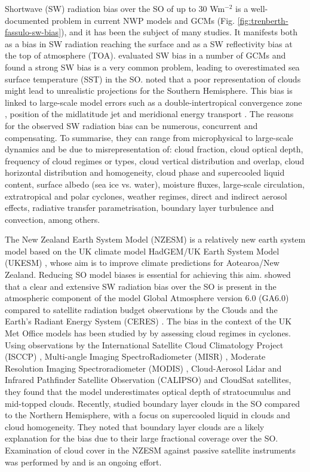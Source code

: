 Shortwave (SW) radiation bias over the SO of up to 30 Wm$^{-2}$ is a
well-documented problem in current NWP models and GCMs
\citep{trenberth2010} (Fig. \ref{fig:trenberth-fassulo-sw-bias}),
and it has been the subject of many studies.
It manifests both as a bias in SW radiation reaching the surface and as a
SW reflectivity bias at the top of atmosphere (TOA).
\cite{bodas-salcedo2014} evaluated SW bias in a number
of GCMs and found a strong SW bias is a very common problem, leading to
overestimated sea surface temperature (SST) in the SO.
\cite{trenberth2010} noted that a poor representation of clouds might lead to
unrealistic projections for the Southern Hemisphere. This bias is linked to
large-scale model errors such as a double-intertropical
convergence zone \citep{hwang2013}, position of the midlatitude jet and
meridional energy transport \citep{mason2014}.
The reasons for the observed SW radiation bias
can be numerous, concurrent and compensating. To summarise, they can range
from microphysical to large-scale dynamics and be due to misrepresentation of:
cloud fraction, cloud optical depth, frequency of cloud regimes or types,
cloud vertical distribution and overlap, cloud horizontal distribution
and homogeneity, cloud phase and supercooled liquid content, surface albedo
(sea ice vs. water), moisture fluxes, large-scale circulation, extratropical
and polar cyclones, weather regimes, direct and indirect aerosol effects,
radiative transfer parametrisation, boundary layer turbulence and convection,
among others.

The New Zealand Earth System Model (NZESM)
is a relatively new earth system model based on the UK climate model HadGEM/UK Earth System Model (UKESM)
\citep{williams2016}, whose aim is to improve climate predictions for
Aotearoa/New Zealand. Reducing SO model biases is essential for
achieving this aim. \cite{walters2017}
showed that a clear and extensive SW radiation bias over the SO
is present in the atmospheric component of the model Global Atmosphere version 6.0 (GA6.0) compared to satellite
radiation budget observations by the Clouds and the Earth's Radiant Energy
System (CERES) \citep{wielicki1996}. The bias in the context of the UK Met Office
models has been studied by \cite{bodas-salcedo2012} by assessing cloud
regimes in cyclones.
Using observations by the International Satellite Cloud Climatology Project
(ISCCP) \citep{rossow1999},
Multi-angle Imaging SpectroRadiometer (MISR) \citep{diner1998}, Moderate Resolution Imaging Spectroradiometer (MODIS) \citep{salomonson2002},
Cloud-Aerosol Lidar and Infrared Pathfinder Satellite Observation
(CALIPSO) \citep{winker2010} and CloudSat \citep{stephens2002} satellites,
they found that the model underestimates optical depth of stratocumulus and
mid-topped clouds. Recently, \cite{davies2017} studied boundary layer
clouds in the SO compared to the Northern Hemisphere,
with a focus on supercooled liquid in clouds and cloud homogeneity.
They noted that boundary layer clouds are a likely explanation for the bias
due to their large fractional coverage over the SO.
Examination of cloud cover in the NZESM against passive satellite instruments
was performed by \cite{schuddeboom2017,schuddeboom2019} and is an ongoing effort.

